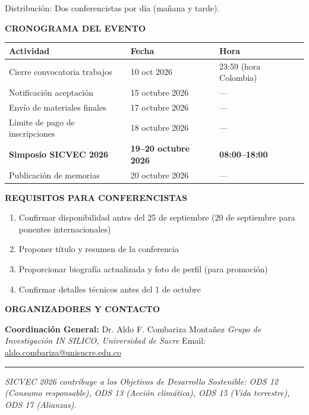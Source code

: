 \documentclass[11pt,a4paper]{article}
\begin{document}
Distribución: Dos conferencistas por día (mañana y tarde).

\vspace{0.2cm}

\noindent
\textbf{CRONOGRAMA DEL EVENTO}

\begin{tabular}{lll}
\textbf{Actividad} & \textbf{Fecha} & \textbf{Hora} \\
\hline
Cierre convocatoria trabajos & 10 oct 2026 & 23:59 (hora Colombia) \\
Notificación aceptación & 15 octubre 2026 & — \\
Envío de materiales finales & 17 octubre 2026 & — \\
Límite de pago de inscripciones & 18 octubre 2026 & — \\
\textbf{Simposio SICVEC 2026} & \textbf{19–20 octubre 2026} & \textbf{08:00–18:00} \\
Publicación de memorias & 20 octubre 2026 & — \\
\end{tabular}

\vspace{0.2cm}

\noindent
\textbf{REQUISITOS PARA CONFERENCISTAS}

\begin{enumerate}\setlength{\itemsep}{0.15cm}
\item Confirmar disponibilidad antes del 25 de septiembre (20 de septiembre para ponentes internacionales)
\item Proponer título y resumen de la conferencia
\item Proporcionar biografía actualizada y foto de perfil (para promoción)
\item Confirmar detalles técnicos antes del 1 de octubre
\end{enumerate}

\vspace{0.2cm}

\noindent
\textbf{ORGANIZADORES Y CONTACTO}

\textbf{Coordinación General:} Dr. Aldo F. Combariza Montañez
\textit{Grupo de Investigación IN SILICO, Universidad de Sucre}
Email: \href{mailto:aldo.combariza@unisucre.edu.co}{aldo.combariza@unisucre.edu.co}

\vspace{0.2cm}

\noindent
\rule{\textwidth}{0.5pt}

\vspace{0.2cm}

\noindent
\textit{\small SICVEC 2026 contribuye a los Objetivos de Desarrollo Sostenible: ODS 12 (Consumo responsable), ODS 13 (Acción climática), ODS 15 (Vida terrestre), ODS 17 (Alianzas).}
\end{document}
